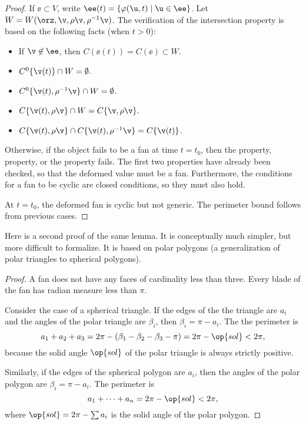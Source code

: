 \begin{proof}
  If $\ee\subset V$,
write $\ee(t) = \{\varphi(\u,t) \mid \u\in \ee\}$.  Let $W
=W(\orz,\v,\rho\v,\rho^{-1}\v)$. The verification of the intersection
property is based on the following facts (when $t>0$):
\begin{itemize} 
\item If $\v\not\in \ee$, then $C(\ee(t))=C(\ee)\subset W$.
\item $C^0\{\v(t)\} \cap W = \emptyset$.
\item $C^0\{\v(t),\rho^{-1}\v\}\cap W = \emptyset$.
\item $C\{\v(t),\rho\v\}\cap W = C\{\v,\rho\v\}.$
\item $C\{\v(t),\rho\v\}\cap C\{\v(t),\rho^{-1}\v\} = C\{\v(t)\}$.
\end{itemize}

Otherwise, if the object fails to be a fan at time $t=t_0$, then the
 property,  property, or the
 property fails.  The first two properties have already
been checked, so that the deformed value must be a fan.  Furthermore,
the conditions for a fan to be cyclic are closed conditions, so they
must also hold.

At $t=t_0$, the deformed fan is cyclic but not generic.  The perimeter
bound follows from previous cases.
\end{proof}

Here is a second proof of the same lemma.  It is conceptually much
simpler, but more difficult to formalize.  It is based on polar
polygons (a generalization of polar triangles to spherical polygons).

\begin{proof} A fan does not have any faces of cardinality less than
three.  Every blade of the fan has radian measure less than $\pi$.
%

Consider the case of a spherical triangle.  If the edges of the
the triangle are $a_i$ and the angles of the polar
triangle are $\beta_i$, then $\beta_i=\pi-a_i$.
The the perimeter is 
\begin{displaymath}a_1+a_2+a_3 = 2\pi - (\beta_1 -\beta_2 -
\beta_3-\pi)= 2\pi-\op{sol} < 2\pi,\end{displaymath} because the
solid angle $\op{sol}$ of the polar triangle is always strictly
positive.  %

Similarly, if the edges of the spherical polygon are
$a_i$, then the angles of the polar polygon are $\beta_i = \pi-a_i$.
The perimeter is
\begin{displaymath}
a_1+\cdots+a_n  = 2\pi- \op{sol}< 2\pi,
\end{displaymath}
where $\op{sol} = 2\pi-\sum a_i$ is the solid angle of the polar polygon.
%
\end{proof}


